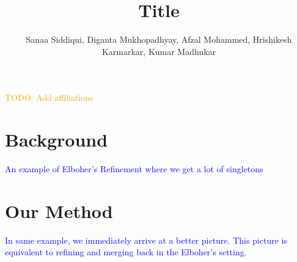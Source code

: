 \documentclass[sigplan,screen,natbib=false]{acmart}
\title{Title}
\author{Sanaa Siddiqui, Diganta Mukhopadhyay, Afzal Mohammed, Hrishikesh
Karmarkar, Kumar Madhukar }
\newcommand{\dmcmt}[1]{\textcolor{blue}{#1}}
\newcommand{\todo}[1]{\textcolor{orange}{TODO: #1}}
\begin{document}
\maketitle
\todo{ Add affiliations}







\section{Background}

\dmcmt{ 
    An example of Elboher's Refinement where we get a lot of singletons
}


\section{Our Method}

\dmcmt{
    In same example, we immediately arrive at a better picture. 
    This picture is equivalent to refining and merging back in the Elboher's
    setting.
} 

\end{document}
